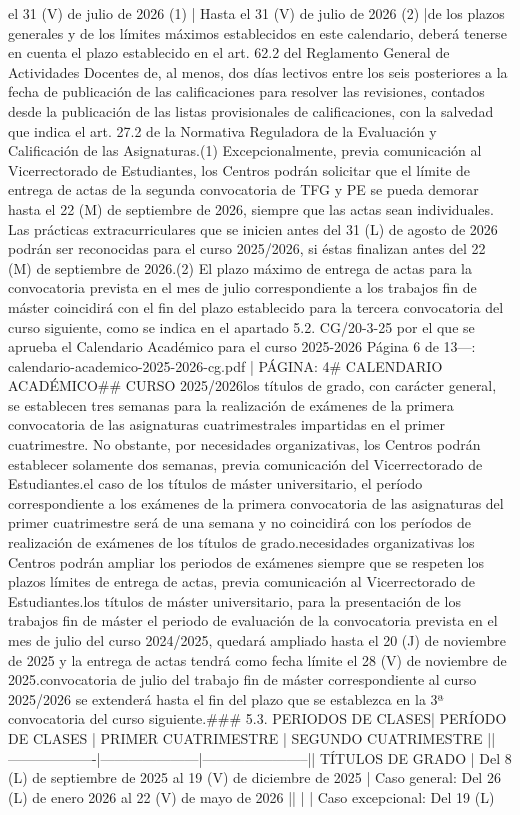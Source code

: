 \documentclass{article}
\begin{document}
\begin{itemize}
{el 31 (V) de julio de 2026 (1)       | Hasta el 31 (V) de julio de 2026 (2)          |\n\nDentro de los plazos generales y de los límites máximos establecidos en este calendario, deberá tenerse en cuenta el plazo establecido en el art. 62.2 del Reglamento General de Actividades Docentes de, al menos, dos días lectivos entre los seis posteriores a la fecha de publicación de las calificaciones para resolver las revisiones, contados desde la publicación de las listas provisionales de calificaciones, con la salvedad que indica el art. 27.2 de la Normativa Reguladora de la Evaluación y Calificación de las Asignaturas.\n\n(1) Excepcionalmente, previa comunicación al Vicerrectorado de Estudiantes, los Centros podrán solicitar que el límite de entrega de actas de la segunda convocatoria de TFG y PE se pueda demorar hasta el 22 (M) de septiembre de 2026, siempre que las actas sean individuales. Las prácticas extracurriculares que se inicien antes del 31 (L) de agosto de 2026 podrán ser reconocidas para el curso 2025/2026, si éstas finalizan antes del 22 (M) de septiembre de 2026.\n\n(2) El plazo máximo de entrega de actas para la convocatoria prevista en el mes de julio correspondiente a los trabajos fin de máster coincidirá con el fin del plazo establecido para la tercera convocatoria del curso siguiente, como se indica en el apartado 5.2.\n{} CG/20-3-25 por el que se aprueba el Calendario Académico para el curso 2025-2026  Página 6 de 13\n\n---\n\nFUENTE: calendario-academico-2025-2026-cg.pdf | PÁGINA: 4\n# CALENDARIO ACADÉMICO\n## CURSO 2025/2026\n\nEn los títulos de grado, con carácter general, se establecen tres semanas para la realización de exámenes de la primera convocatoria de las asignaturas cuatrimestrales impartidas en el primer cuatrimestre. No obstante, por necesidades organizativas, los Centros podrán establecer solamente dos semanas, previa comunicación del Vicerrectorado de Estudiantes.\n\nPara el caso de los títulos de máster universitario, el período correspondiente a los exámenes de la primera convocatoria de las asignaturas del primer cuatrimestre será de una semana y no coincidirá con los períodos de realización de exámenes de los títulos de grado.\n\nPor necesidades organizativas los Centros podrán ampliar los periodos de exámenes siempre que se respeten los plazos límites de entrega de actas, previa comunicación al Vicerrectorado de Estudiantes.\n\nEn los títulos de máster universitario, para la presentación de los trabajos fin de máster el periodo de evaluación de la convocatoria prevista en el mes de julio del curso 2024/2025, quedará ampliado hasta el 20 (J) de noviembre de 2025 y la entrega de actas tendrá como fecha límite el 28 (V) de noviembre de 2025.\n\nLa convocatoria de julio del trabajo fin de máster correspondiente al curso 2025/2026 se extenderá hasta el fin del plazo que se establezca en la 3ª convocatoria del curso siguiente.\n\n### 5.3. PERIODOS DE CLASES\n\n| PERÍODO DE CLASES | PRIMER CUATRIMESTRE | SEGUNDO CUATRIMESTRE |\n|-------------------|---------------------|-----------------------|\n| TÍTULOS DE GRADO  | Del 8 (L) de septiembre de 2025 al 19 (V) de diciembre de 2025 | Caso general: Del 26 (L) de enero 2026 al 22 (V) de mayo de 2026 |\n|                   |                     | Caso excepcional: Del 19 (L) }
\end{itemize}
\end{document}
